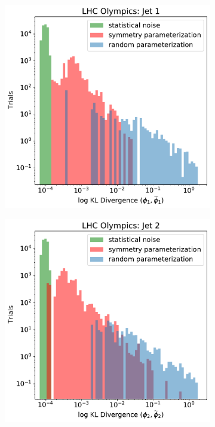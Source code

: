 \begin{figure}
    \centering
    \begin{subfigure}[b]{0.45\textwidth}
        \centering
        \includegraphics[width=\textwidth]{figures/chapter-09/KL_Div1.pdf}
        \caption{}
        \label{fig:KLdiv_i}
    \end{subfigure}
    \hfill
    \begin{subfigure}[b]{0.45\textwidth}
        \centering
        \includegraphics[width=\textwidth]{figures/chapter-09/KL_Div2.pdf}

\end{subfigure}
\end{figure}
